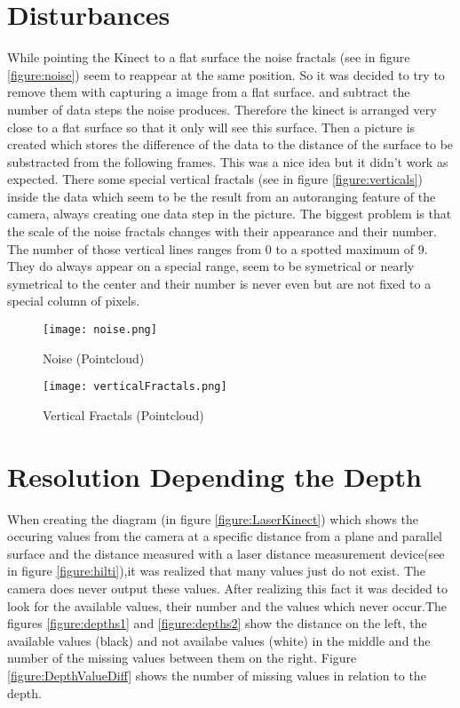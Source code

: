 \section{Disturbances}
While pointing the Kinect to a flat surface the noise fractals (see in figure \vref{figure:noise}) 
seem to reappear at the same position. So it was decided to try to remove them with capturing a image from a flat surface.
and subtract the number of data steps the noise produces. Therefore the kinect is arranged very close to a flat surface 
so that it only will see this surface. Then a picture is created which stores the difference of the data to the 
distance of the surface to be substracted from the following frames.
This was a nice idea but it didn't work as expected. There some special vertical fractals (see in figure \vref{figure:verticals}) 
inside the data which seem to be the result from an autoranging feature of the camera, 
always creating one data step in the picture. The biggest problem is that the scale of the noise fractals changes 
with their appearance and their number. The number of those vertical lines ranges from 0 to a spotted maximum of 9. 
They do always appear on a special range, seem to be symetrical or 
nearly symetrical to the center and their number is never even but are not fixed to a special column of pixels. 
\begin{figure}[htp]
\begin{center}
  \texttt{[image: noise.png]}
  \caption{Noise (Pointcloud)}
  \label{figure:noise}
\end{center}
\end{figure}

\begin{figure}[htp]
\begin{center}
  \texttt{[image: verticalFractals.png]}
  \caption{Vertical Fractals (Pointcloud)}
  \label{figure:verticals}
\end{center}
\end{figure}

\section{Resolution Depending the Depth} \label{resdepDepth}
When creating the diagram (in figure \vref{figure:LaserKinect}) which shows the occuring values from the camera 
at a specific distance from a plane and parallel surface and the distance measured with a laser distance measurement 
device(see in figure \vref{figure:hilti}),it was realized that many values just do not exist. The camera does never output 
these values. After realizing this fact it was decided to look for the available values, their number and the values which 
never occur.The figures \vref{figure:depths1} and \vref{figure:depths2} show the distance on the left, 
the available values (black) and not availabe values (white) in the middle and the number of the missing values between them 
on the right. Figure \vref{figure:DepthValueDiff} shows the number of missing values in relation to the depth.

